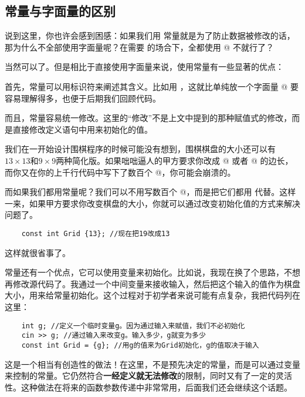 \subsection*{常量与字面量的区别}
说到这里，你也许会感到困感：如果我们用 \lstinline@const@ 常量就是为了防止数据被修改的话，那为什么不全部使用字面量呢？在需要 \lstinline@Pi@ 的场合下，全都使用 @ 不就行了？\par
当然可以了。但是相比于直接使用字面量来说，使用常量有一些显著的优点：\par
首先，常量可以用标识符来阐述其含义。比如用 \lstinline@Grid@，这就比单纯放一个字面量 @ 要容易理解得多，也便于后期我们回顾代码。\par
而且，常量容易统一修改。这里的``修改''不是上文中提到的那种赋值式的修改，而是直接修改定义语句中用来初始化的值。\par
我们在一开始设计围棋程序的时候可能没有想到，围棋棋盘的大小还可以有$13\times13$和$9\times9$两种简化版。如果咄咄逼人的甲方要求你改成 @ 或者 @ 的边长，而你又在你的上千行代码中写下了数百个 @，你可能会崩溃的。\par
而如果我们都用常量呢？我们可以不用写数百个 @，而是把它们都用 \lstinline@Grid@ 代替。这样一来，如果甲方要求你改变棋盘的大小，你就可以通过改变初始化值的方式来解决问题了。
\begin{lstlisting}
    const int Grid {13}; //现在把19改成13
\end{lstlisting}
这样就很省事了。\par
常量还有一个优点，它可以使用变量来初始化。比如说，我现在换了个思路，不想再修改源代码了。我通过一个中间变量来接收输入，然后把这个输入的值作为棋盘大小，用来给常量初始化。这个过程对于初学者来说可能有点复杂，我把代码列在这里：
\begin{lstlisting}
    int g; //定义一个临时变量g。因为通过输入来赋值，我们不必初始化
    cin >> g; //通过输入来改变g。输入多少，g就变为多少
    const int Grid = {g}; //用g的值来为Grid初始化，g的值取决于输入
\end{lstlisting}
这是一个相当有创造性的做法！在这里，\lstinline@Grid@ 不是预先决定的常量，而是可以通过变量来控制的常量。它仍然符合\textbf{一经定义就无法修改}的限制，同时又有了一定的灵活性。这种做法在将来的函数参数传递中非常常用，后面我们还会继续这个话题。\par
